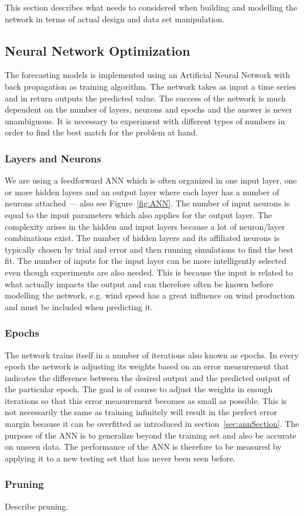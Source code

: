 This section describes what needs to considered when building and modelling the network in terms of actual design and data set manipulation.

\subsection{Neural Network Optimization}
The forecasting models is implemented using an Artificial Neural Network with back propagation as training algorithm. The network takes as input a time series and in return outputs the predicted value. The success of the network is much dependent on the number of layers, neurons and epochs and the answer is never unambiguous. It is necessary to experiment with different types of numbers in order to find the best match for the problem at hand.

\subsubsection{Layers and Neurons}
We are using a feedforward ANN which is often organized in one input layer, one or more hidden layers and an output layer where each layer has a number of neurons attached\cite{1} --- also see Figure~\ref{fig:ANN}. The number of input neurons is equal to the input parameters which also applies for the output layer. 
The complexity arises in the hidden and input layers because a lot of neuron/layer combinations exist. The number of hidden layers and its affiliated neurons is typically chosen by trial and error and then running simulations to find the best fit\cite{1}. The number of inputs for the input layer can be more intelligently selected even though experiments are also needed. This is because the input is related to what actually impacts the output and can therefore often be known before modelling the network, e.g. wind speed has a great influence on wind production and must be included when predicting it.

\subsubsection{Epochs}
The network trains itself in a number of iterations also known as epochs. In every epoch the network is adjusting its weights based on an error measurement that indicates the difference between the desired output and the predicted output of the particular epoch\cite{1}. The goal is of course to adjust the weights in enough iterations so that this error measurement becomes as small as possible. This is not necessarily the same as training infinitely will result in the perfect error margin because it can be overfitted as introduced in section~\ref{sec:annSection}. The purpose of the ANN is to generalize beyond the training set and also be accurate on unseen data\cite{1}. The performance of the ANN is therefore to be measured by applying it to a new testing set that has never been seen before.

\subsubsection{Pruning}
Describe pruning.